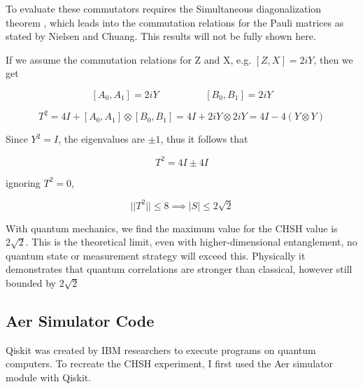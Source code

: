 \documentclass[12pt]{article}
\begin{document}
To evaluate these commutators requires the Simultaneous diagonalization theorem \cite{Quantum_Information}, which leads into the commutation relations for the Pauli matrices as stated by Nielsen and Chuang. This results will not be fully shown here.  

If we assume the commutation relations for Z and X, e.g. $[Z,X] = 2iY$, then we get

$$
[A_0, A_1] = 2iY \hspace{2cm} [B_0, B_1] = 2iY
$$

$$
T^2 = 4I + [A_0, A_1] \otimes [B_0, B_1] = 4I + 2iY \otimes 2iY = 4I - 4(Y \otimes Y)
$$

Since $Y^2 = I$, the eigenvalues are $\pm1$, thus it follows that

$$
T^2 = 4I \pm4I
$$

ignoring $T^2 = 0$,

$$
||T^2|| \leq 8 \implies |S| \leq 2\sqrt{2}
$$

With quantum mechanics, we find the maximum value for the CHSH value is $2\sqrt{2}$. This is the theoretical limit, even with higher-dimensional entanglement, no quantum state or measurement strategy will exceed this. Physically it demonstrates that quantum correlations are stronger than classical, however still bounded by $2\sqrt{2}$





\newpage
\subsection{Aer Simulator Code}
Qiskit was created by IBM researchers to execute programs on quantum computers. To recreate the CHSH experiment, I first used the Aer simulator module with Qiskit. \cite{qiskit}
\end{document}
